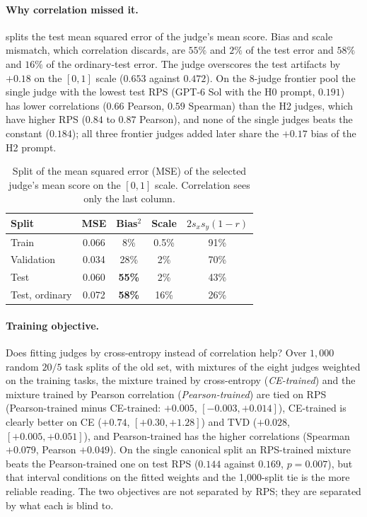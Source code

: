 \paragraph{Why correlation missed it.}
 splits the test mean squared error of the judge's mean score.
Bias and scale mismatch, which correlation discards, are $55\%$ and $2\%$ of the test error and $58\%$ and $16\%$ of the ordinary-test error.
The judge overscores the test artifacts by $+0.18$ on the $[0,1]$ scale ($0.653$ against $0.472$).
On the 8-judge frontier pool the single judge with the lowest test RPS (GPT-6 Sol with the H0 prompt, $0.191$) has lower correlations ($0.66$ Pearson, $0.59$ Spearman) than the H2 judges, which have higher RPS ($0.84$ to $0.87$ Pearson), and none of the single judges beats the constant ($0.184$); all three frontier judges added later share the $+0.17$ bias of the H2 prompt.

\begin{table}[t]
\caption{Split of the mean squared error (MSE) of the selected judge's mean score on the $[0,1]$ scale. Correlation sees only the last column.}
\label{tab:mse}
\centering\small
\begin{tabular}{lcccc}
\toprule
Split & MSE & Bias$^2$ & Scale & $2s_xs_y(1{-}r)$\\
\midrule
Train & 0.066 & 8\% & 0.5\% & 91\%\\
Validation & 0.034 & 28\% & 2\% & 70\%\\
Test & 0.060 & \textbf{55\%} & 2\% & 43\%\\
Test, ordinary & 0.072 & \textbf{58\%} & 16\% & 26\%\\
\bottomrule
\end{tabular}
\end{table}

\paragraph{Training objective.}
Does fitting judges by cross-entropy instead of correlation help?
Over $1{,}000$ random $20/5$ task splits of the old set, with mixtures of the eight judges weighted on the training tasks, the mixture trained by cross-entropy (\emph{CE-trained}) and the mixture trained by Pearson correlation (\emph{Pearson-trained}) are tied on RPS (Pearson-trained minus CE-trained: $+0.005$, $[-0.003,+0.014]$), CE-trained is clearly better on CE ($+0.74$, $[+0.30,+1.28]$) and TVD ($+0.028$, $[+0.005,+0.051]$), and Pearson-trained has the higher correlations (Spearman $+0.079$, Pearson $+0.049$).
On the single canonical split an RPS-trained mixture beats the Pearson-trained one on test RPS ($0.144$ against $0.169$, $p=0.007$), but that interval conditions on the fitted weights and the 1{,}000-split tie is the more reliable reading.
The two objectives are not separated by RPS; they are separated by what each is blind to.

